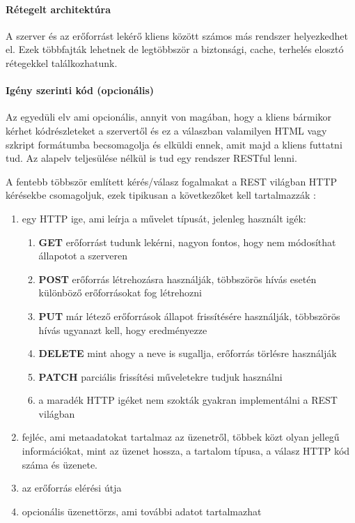 \paragraph{Rétegelt architektúra} A szerver és az erőforrást lekérő kliens között számos más rendszer helyezkedhet el. Ezek többfajták lehetnek de legtöbbször a biztonsági, cache, terhelés elosztó rétegekkel találkozhatunk.
\paragraph{Igény szerinti kód (opcionális)} Az egyedüli elv ami opcionális, annyit von magában, hogy a kliens bármikor kérhet kódrészleteket a szervertől és ez a válaszban valamilyen HTML vagy szkript formátumba becsomagolja és elküldi ennek, amit majd a kliens futtatni tud. Az alapelv teljesülése nélkül is tud egy rendszer RESTful lenni.


A fentebb többször említett kérés/válasz fogalmakat a REST világban HTTP kérésekbe csomagoljuk, ezek tipikusan a következőket kell tartalmazzák \cite{rest_2}:
\begin{enumerate}
	\item egy HTTP ige, ami leírja a művelet típusát, jelenleg használt igék:
	\begin{enumerate}
		\item \textbf{GET} erőforrást tudunk lekérni, nagyon fontos, hogy nem módosíthat állapotot a szerveren
		\item \textbf{POST} erőforrás létrehozásra használják, többszörös hívás esetén különböző erőforrásokat fog létrehozni
		\item \textbf{PUT} már létező erőforrások állapot frissítésére használják, többszörös hívás ugyanazt kell, hogy eredményezze
		\item \textbf{DELETE} mint ahogy a neve is sugallja, erőforrás törlésre használják 
		\item \textbf{PATCH} parciális frissítési műveletekre tudjuk használni
		\item a maradék HTTP igéket nem szokták gyakran implementálni a REST világban
	\end{enumerate} 
	\item fejléc, ami metaadatokat tartalmaz az üzenetről, többek közt olyan jellegű információkat, mint az üzenet hossza, a tartalom típusa, a válasz HTTP kód száma és üzenete.
	\item az erőforrás elérési útja
	\item opcionális üzenettörzs, ami további adatot tartalmazhat
\end{enumerate}


